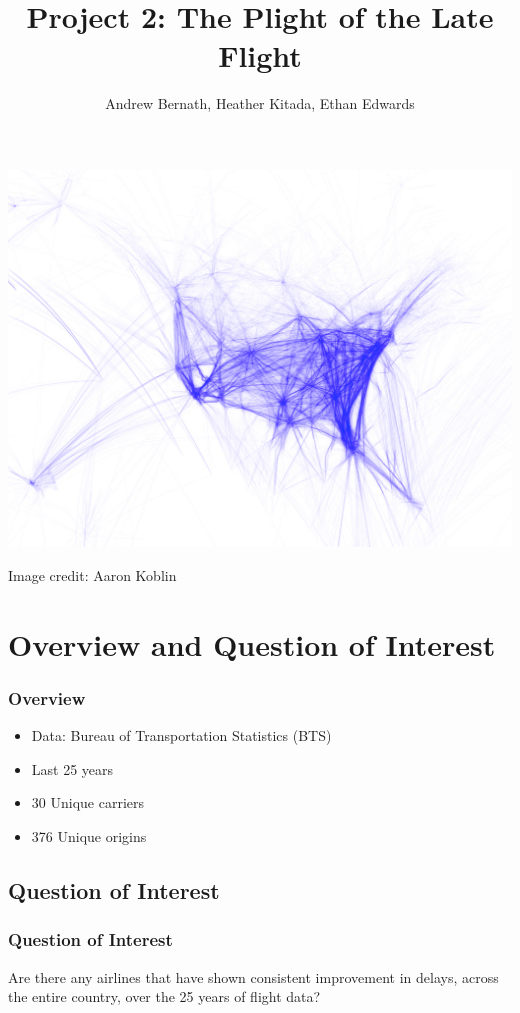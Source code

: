 \documentclass{beamer}
\title{Project 2: The Plight of the Late Flight}
\author{Andrew Bernath, Heather Kitada, Ethan Edwards}
\institute{Oregon State University}
\begin{document}
\begin{frame}
\titlepage
\end{frame}


\begin{frame}
\begin{center} 
\includegraphics[width=.8 \textwidth]{airtraffic}
\end{center}
\tiny{Image credit: Aaron Koblin}

\end{frame}

\begin{frame}{\contentsname}
\begin{multicols}{2}
\tableofcontents
\end{multicols}
\end{frame}

\section{Overview and Question of Interest}
\begin{frame}
\frametitle{Overview}
\begin{itemize}
\item Data: Bureau of Transportation Statistics (BTS)
\item Last 25 years 
\item 30 Unique carriers 
\item 376 Unique origins 
\end{itemize}

\end{frame}

\subsection{Question of Interest}
\begin{frame}
\frametitle{Question of Interest}

Are there any airlines that have shown consistent improvement in delays, across the entire country, over the 25 years of flight data?

\end{frame}
\end{document}
